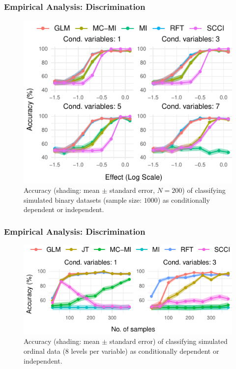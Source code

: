 \documentclass{beamer}
\begin{document}
\begin{frame}
	\frametitle{Empirical Analysis: Discrimination}
	\begin{figure}
		\centering
		\includegraphics{imgs/accuracy.pdf}
		\caption*{Accuracy (shading: mean $\pm$ standard error, $N=200$)
		of classifying simulated binary datasets (sample size: $1000$)
		as conditionally dependent or independent.}
	\end{figure}
\end{frame}

\begin{frame}
	\frametitle{Empirical Analysis: Discrimination}
	\begin{figure}
		\centering
		\includegraphics{imgs/accuracy_ordinal.pdf}
		\caption*{Accuracy (shading: mean $\pm$ standard error) of
		classifying simulated ordinal data (8 levels per variable) as
		conditionally dependent or independent.}	
	\end{figure}
\end{frame}
\end{document}
